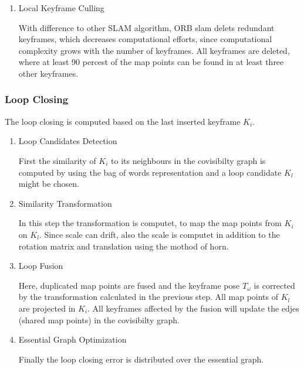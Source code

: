 \begin{enumerate}
	\item{Local Keyframe Culling}
	
	With difference to other SLAM algorithm, ORB slam delets redundant 
	keyframes, which decreases computational efforts, since computational
	complexity grows with the number of keyframes. All keyframes are deleted, 
	where at least 90 percest of the map points can be found in at least three other 
	keyframes. 
	
	
	\end{enumerate}
	
	\subsubsection{Loop Closing}
	
	The loop closing is computed based on the last inserted keyframe $K_i$. 
	
	\begin{enumerate}
	\item{Loop Candidates Detection}
	
	First the similarity of $K_i$ to its neighbours in the covisibilty
	graph is computed by using the bag of words representation and a 
	loop candidate $K_l$ might be chosen. 
	
	\item{Similarity Transformation}
	
	In this step the transformation is computet, to map the map points
	from $K_i$ on $K_l$. Since scale can drift, also the scale is computet
	in addition to the rotation matrix and translation using the mothod of horn. 
	
	
	\item{Loop Fusion}
	
	Here, duplicated map points are fused and the keyframe pose $T_\omega$ is corrected by the transformation
	calculated in the previous step. All map points of $K_l$ are projected in $K_i$. 
	All keyframes affected by the fusion will update the edjes (shared map points) in the 
	covisibilty graph. 
	
	\item{ Essential Graph Optimization}
	
	Finally the loop closing error is distributed over the essential graph. 
	
	
	\end{enumerate}
	
	
	
	
	
